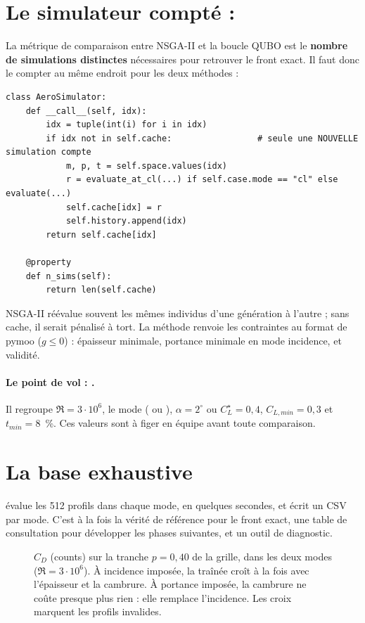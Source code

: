 \section{Le simulateur compté : }
La métrique de comparaison entre NSGA-II et la boucle QUBO est le \textbf{nombre de simulations distinctes} nécessaires pour retrouver le front exact. Il faut donc le compter au même endroit pour les deux méthodes :
\begin{lstlisting}
class AeroSimulator:
    def __call__(self, idx):
        idx = tuple(int(i) for i in idx)
        if idx not in self.cache:                 # seule une NOUVELLE simulation compte
            m, p, t = self.space.values(idx)
            r = evaluate_at_cl(...) if self.case.mode == "cl" else evaluate(...)
            self.cache[idx] = r
            self.history.append(idx)
        return self.cache[idx]

    @property
    def n_sims(self):
        return len(self.cache)
\end{lstlisting}
NSGA-II réévalue souvent les mêmes individus d'une génération à l'autre ; sans cache, il serait pénalisé à tort. La méthode  renvoie les contraintes au format de pymoo ($g\le0$) : épaisseur minimale, portance minimale en mode incidence, et validité.

\paragraph{Le point de vol : .} Il regroupe $\Re=3\cdot10^6$, le mode ( ou ), $\alpha=2^\circ$ ou $C_L^\star=0{,}4$, $C_{L,min}=0{,}3$ et $t_{min}=8$~\%. Ces valeurs sont à figer en équipe avant toute comparaison.

\section{La base exhaustive}
 évalue les 512 profils dans chaque mode, en quelques secondes, et écrit un CSV par mode. C'est à la fois la vérité de référence pour le front exact, une table de consultation pour développer les phases suivantes, et un outil de diagnostic.

\begin{figure}[htbp]
\centering

\caption{$C_D$ (counts) sur la tranche $p=0{,}40$ de la grille, dans les deux modes ($\Re=3\cdot10^6$). À incidence imposée, la traînée croît à la fois avec l'épaisseur et la cambrure. À portance imposée, la cambrure ne coûte presque plus rien : elle remplace l'incidence. Les croix marquent les profils invalides.}\label{fig:base}
\end{figure}

